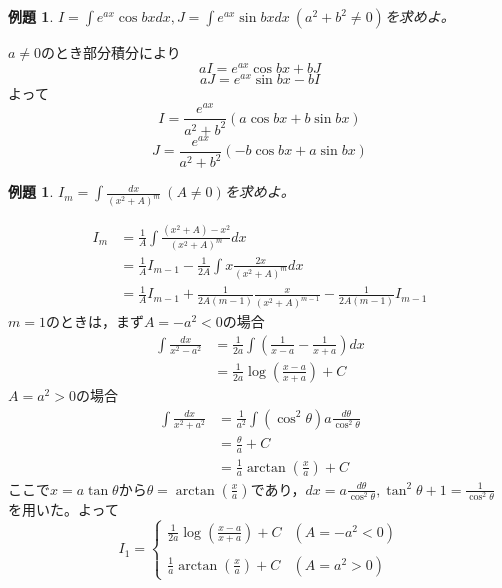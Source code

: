 \documentclass[dvipdfmx,a4j,10pt]{jsarticle}
\makeatletter
\theoremstyle{mystyle1}
\newtheorem{ex}[dfn]{例題}
\theoremstyle{mystyle2}
\newtheorem{ans}{解答}
\renewenvironment{ans}[1][解答]{\par
  \pushQED{\qed}%
  \normalfont
  \topsep6\p@\@plus6\p@ \trivlist
  \item[\hskip\labelsep{\bfseries\sffamily #1}]\ignorespaces
}{%
  \popQED\endtrivlist\@endpefalse
}
\makeatother
\begin{document}
\begin{shaded}
    \begin{ex}\label{ex9.25}
        $\displaystyle I=\int e^{ax}\cos{bx} dx,J=\int e^{ax}\sin{bx} dx\ (a^2+b^2\neq0)$を求めよ。
    \end{ex}
\end{shaded}

\begin{ans}[解答\ref{ex9.25}]
    $a\neq0$のとき部分積分により
    \[
    aI=e^{ax}\cos{bx}+bJ
    \]
    \[
    aJ=e^{ax}\sin{bx}-bI
    \]
    よって
    \[
    I=\frac{e^{ax}}{a^2+b^2}(a\cos{bx}+b\sin{bx})
    \]
    \[
    J=\frac{e^{ax}}{a^2+b^2}(-b\cos{bx}+a\sin{bx})
    \]
\end{ans}

\begin{shaded}
    \begin{ex}\label{ex9.3}
        $\displaystyle I_m=\int \frac{dx}{(x^2+A)^m}\ (A\neq0)$を求めよ。
    \end{ex}
\end{shaded}
\begin{ans}[解答\ref{ex9.3}]
    \[
    \begin{split}
    I_m
    &=\frac{1}{A}\int\frac{(x^2+A)-x^2}{(x^2+A)^m}dx\\
    &=\frac{1}{A}I_{m-1}-\frac{1}{2A}\int x\frac{2x}{(x^2+A)^m}dx\\
    &=\frac{1}{A}I_{m-1}+\frac{1}{2A(m-1)}\frac{x}{(x^2+A)^{m-1}}-\frac{1}{2A(m-1)}I_{m-1}
    \end{split}
    \]
    $m=1$のときは，まず$A=-a^2<0$の場合
    \[
    \begin{split}
    \int\frac{dx}{x^2-a^2}
    &=\frac{1}{2a}\int\left(\frac{1}{x-a}-\frac{1}{x+a}\right)dx\\
    &=\frac{1}{2a}\log\left(\frac{x-a}{x+a}\right)+C
    \end{split}
    \]
    $A=a^2>0$の場合
    \[
    \begin{split}
    \int\frac{dx}{x^2+a^2}
    &=\frac{1}{a^2}\int(\cos^2\theta)a\frac{d\theta}{\cos^2\theta}\\
    &=\frac{\theta}{a}+C\\
    &=\frac{1}{a}\arctan\left(\frac{x}{a}\right)+C
    \end{split}
    \]
    ここで$x=a\tan\theta$から$\displaystyle\theta=\arctan\left(\frac{x}{a}\right)$であり，$\displaystyle  dx=a\frac{d\theta}{\cos^2\theta},\tan^2\theta+1=\frac{1}{\cos^2\theta}$
    を用いた。よって
    \[
    I_1=
    \begin{cases}
    \displaystyle\frac{1}{2a}\log\left(\frac{x-a}{x+a}\right)+C & (A=-a^2<0)\\
    \\
    \displaystyle\frac{1}{a}\arctan\left(\frac{x}{a}\right)+C & (A=a^2>0)
    \end{cases}
    \]
\end{ans}
\end{document}
